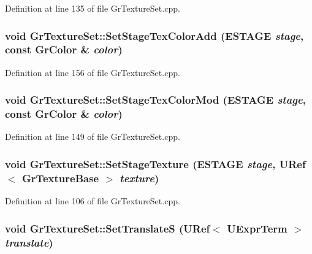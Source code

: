 Definition at line 135 of file GrTextureSet.cpp.\hypertarget{class_gr_texture_set_9c070e7bbebf0a430d44f102f3c1e4e1}{
\subsubsection[{SetStageTexColorAdd}]{\setlength{\rightskip}{0pt plus 5cm}void GrTextureSet::SetStageTexColorAdd ({\bf ESTAGE} {\em stage}, \/  const {\bf GrColor} \& {\em color})}}
\label{class_gr_texture_set_9c070e7bbebf0a430d44f102f3c1e4e1}




Definition at line 156 of file GrTextureSet.cpp.\hypertarget{class_gr_texture_set_33494fb6526112643fbd6f98b86bc15a}{
\subsubsection[{SetStageTexColorMod}]{\setlength{\rightskip}{0pt plus 5cm}void GrTextureSet::SetStageTexColorMod ({\bf ESTAGE} {\em stage}, \/  const {\bf GrColor} \& {\em color})}}
\label{class_gr_texture_set_33494fb6526112643fbd6f98b86bc15a}




Definition at line 149 of file GrTextureSet.cpp.\hypertarget{class_gr_texture_set_778c6a7b1b24b8eed0a01ac77ae53fcc}{
\subsubsection[{SetStageTexture}]{\setlength{\rightskip}{0pt plus 5cm}void GrTextureSet::SetStageTexture ({\bf ESTAGE} {\em stage}, \/  {\bf URef}$<$ {\bf GrTextureBase} $>$ {\em texture})}}
\label{class_gr_texture_set_778c6a7b1b24b8eed0a01ac77ae53fcc}




Definition at line 106 of file GrTextureSet.cpp.\hypertarget{class_gr_texture_set_a00f327706b10cf0cb7035a31a6bf705}{
\subsubsection[{SetTranslateS}]{\setlength{\rightskip}{0pt plus 5cm}void GrTextureSet::SetTranslateS ({\bf URef}$<$ {\bf UExprTerm} $>$ {\em translate})}}
\label{class_gr_texture_set_a00f327706b10cf0cb7035a31a6bf705}




